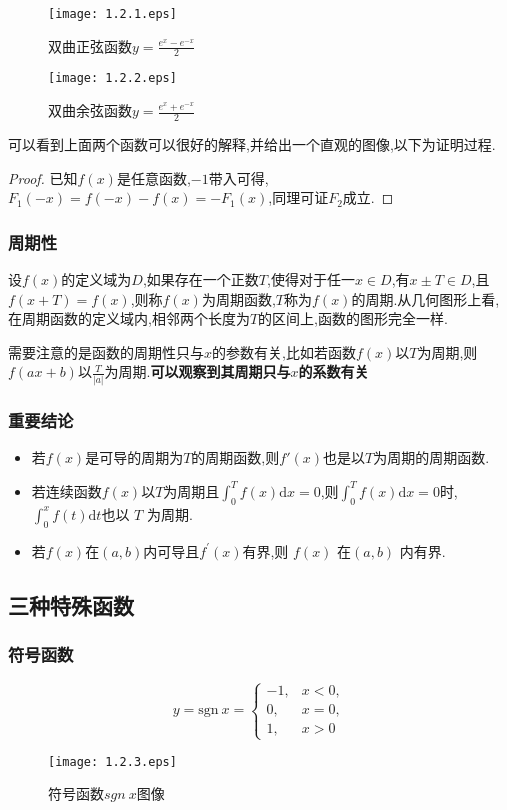 \documentclass[12pt, a4paper, oneside, UTF8]{ctexbook}  %
\begin{document}
\begin{criterion}{}{}
\begin{figure}[H]
        \begin{minipage}[t]{0.5\linewidth}
            \centering
            \texttt{[image: 1.2.1.eps]}
            \caption{双曲正弦函数$y=\frac{e^x-e^{-x}}{2}$}
        \end{minipage}%
        \begin{minipage}[t]{0.5\linewidth}
            \centering
            \texttt{[image: 1.2.2.eps]}
            \caption{双曲余弦函数$y=\frac{e^x+e^{-x}}{2}$}
        \end{minipage}
    \end{figure}
    可以看到上面两个函数可以很好的解释,并给出一个直观的图像,以下为证明过程.
    \begin{proof}
        已知$f(x)$是任意函数,$-1$带入可得,$F_1(-x)=f(-x)-f(x)=-F_1(x)$,同理可证$F_2$成立.
    \end{proof}
\end{criterion}
\subsubsection{周期性}
\begin{defn}{}{}
    设$f(x)$的定义域为$D$,如果存在一个正数$T$,使得对于任一$x \in D$,有$x \pm T \in D$,且$f(x+T)=f(x)$,则称$f(x)$为周期函数,$T$称为$f(x)$的周期.从几何图形上看,在周期函数的定义域内,相邻两个长度为$T$的区间上,函数的图形完全一样.
\end{defn}
需要注意的是函数的周期性只与$x$的参数有关,比如若函数$f(x)$以$T$为周期,则$f(ax+b)$以$\frac{T}{|a|}$为周期.\textbf{可以观察到其周期只与$x$的系数有关}
\subsubsection{重要结论}
\begin{itemize}
    \item 若$f(x)$是可导的周期为$T$的周期函数,则$f'(x)$也是以$T$为周期的周期函数.
    \item 若连续函数$f(x)$以$T$为周期且$\int_{0}^{T}f(x)\mathrm{d}x=0$,则$\int_{0}^{T}f\left(x\right)\mathrm{d}x=0$时,$\int_{0}^{x}f\left(t\right)\mathrm{d}t$也以 $T$ 为周期.
    \item 若$f(x)$在$(a,b)$内可导且$f^{\prime}(x) $有界,则 $f(x)$ 在$(a,b)$ 内有界.
\end{itemize}
\subsection{三种特殊函数}
\subsubsection{符号函数}
$$
    y=\text{sgn} \ x=\begin{cases}-1,&x<0,\\0,&x=0,\\1,&x>0\end{cases}
$$
\begin{figure}[H]
    \centering \texttt{[image: 1.2.3.eps]} \caption{符号函数$sgn \ x$图像}
\end{figure}
\end{document}
